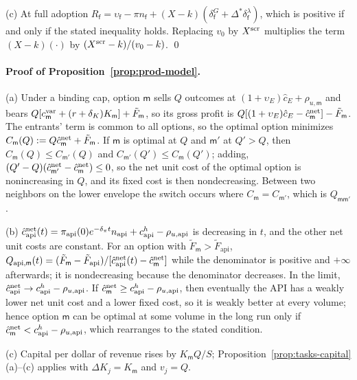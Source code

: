 (c) At full adoption $R_{\mathsf f}=\upsilon_{\mathsf f}-\pi n_{\mathsf f}+(X-k)(\delta^G_{\mathsf f}+\Delta^*\delta^\lambda_{\mathsf f})$, which is positive if and only if the stated inequality holds. Replacing $v_0$ by $X^{\rm scr}$ multiplies the term $(X-k)(\cdot)$ by $(X^{\rm scr}-k)/(v_0-k)$. \qed

\paragraph{Proof of Proposition~\ref{prop:prod-model}.}
(a) Under a binding cap, option $\mathsf m$ sells $Q$ outcomes at $(1+\upsilon_E)\hat c_E+\rho_{u,\mathsf m}$ and bears $Q[c^{\rm var}_{\mathsf m}+(r+\delta_K)K_{\mathsf m}]+\tilde F_{\mathsf m}$, so its gross profit is $Q[(1+\upsilon_E)\hat c_E-\hat c^{\rm net}_{\mathsf m}]-\tilde F_{\mathsf m}$. The entrants' term is common to all options, so the optimal option minimizes $C_{\mathsf m}(Q):=Q\hat c^{\rm net}_{\mathsf m}+\tilde F_{\mathsf m}$. If $\mathsf m$ is optimal at $Q$ and $\mathsf m'$ at $Q'>Q$, then $C_{\mathsf m}(Q)\le C_{\mathsf m'}(Q)$ and $C_{\mathsf m'}(Q')\le C_{\mathsf m}(Q')$; adding, $(Q'-Q)(\hat c^{\rm net}_{\mathsf m'}-\hat c^{\rm net}_{\mathsf m})\le 0$, so the net unit cost of the optimal option is nonincreasing in $Q$, and its fixed cost is then nondecreasing. Between two neighbors on the lower envelope the switch occurs where $C_{\mathsf m}=C_{\mathsf m'}$, which is $Q_{\mathsf m\mathsf m'}$.

(b) $\hat c^{\rm net}_{\mathrm{api}}(t)=\pi_{\mathrm{api}}(0)e^{-\delta_\pi t}n_{\mathrm{api}}+c^h_{\mathrm{api}}-\rho_{u,\mathrm{api}}$ is decreasing in $t$, and the other net unit costs are constant. For an option with $\tilde F_{\mathsf m}>\tilde F_{\mathrm{api}}$, $Q_{\mathrm{api},\mathsf m}(t)=(\tilde F_{\mathsf m}-\tilde F_{\mathrm{api}})/[\hat c^{\rm net}_{\mathrm{api}}(t)-\hat c^{\rm net}_{\mathsf m}]$ while the denominator is positive and $+\infty$ afterwards; it is nondecreasing because the denominator decreases. In the limit, $\hat c^{\rm net}_{\mathrm{api}}\to c^h_{\mathrm{api}}-\rho_{u,\mathrm{api}}$. If $\hat c^{\rm net}_{\mathsf m}\ge c^h_{\mathrm{api}}-\rho_{u,\mathrm{api}}$, then eventually the API has a weakly lower net unit cost and a lower fixed cost, so it is weakly better at every volume; hence option $\mathsf m$ can be optimal at some volume in the long run only if $\hat c^{\rm net}_{\mathsf m}<c^h_{\mathrm{api}}-\rho_{u,\mathrm{api}}$, which rearranges to the stated condition.

(c) Capital per dollar of revenue rises by $K_{\mathsf m}Q/S$; Proposition~\ref{prop:tasks-capital}(a)--(c) applies with $\Delta K_j=K_{\mathsf m}$ and $v_j=Q$.

